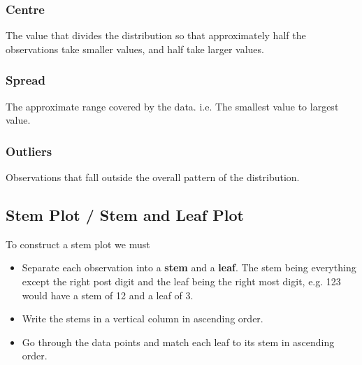 \documentclass[12pt letter]{report}
\begin{document}





\subsubsection{Centre}

The value that divides the distribution so that approximately half the observations take smaller values, and half
take larger values.

\subsubsection{Spread}

The approximate range covered by the data. i.e. The smallest value to largest value.

\subsubsection{Outliers}

Observations that fall outside the overall pattern of the distribution.

\subsection{Stem Plot / Stem and Leaf Plot}

To construct a stem plot we must
\begin{itemize}
	\item Separate each observation into a \textbf{stem} and a \textbf{leaf}. The stem being everything except the right post digit and the leaf being the right most digit, e.g. 123 would have a stem of 12 and a leaf of 3.
	\item Write the stems in a vertical column in ascending order.
	\item Go through the data points and match each leaf to its stem in ascending order.
\end{itemize}
\end{document}
